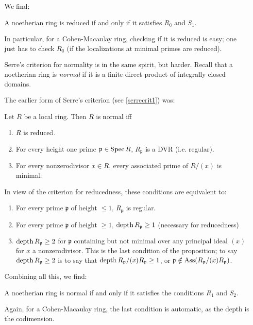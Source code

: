 We find:
\begin{proposition} 
A noetherian ring is reduced if and only if it satisfies $R_0$ and $S_1$.
\end{proposition} 

In particular, for a Cohen-Macaulay ring, checking if it is reduced is
easy; one just has to check $R_0$ (if the localizations at minimal primes are
reduced).


Serre's criterion for normality is in the same spirit, but harder.
Recall that
a noetherian ring is \textit{normal} if it is a finite direct
product of
integrally closed domains.

The earlier form of Serre's criterion (see \cref{serrecrit1}) was:
\begin{proposition}
Let $R$ be a local ring.
Then $R$ is normal iff
\begin{enumerate}
\item  $R$ is reduced.
\item For every height one prime $\mathfrak{p}  \in \operatorname{Spec} R$,
$R_{\mathfrak{p}}$ is a DVR (i.e. regular).
\item For every nonzerodivisor $x \in R$, every associated prime
of $R/(x)$ is
minimal.
\end{enumerate}
\end{proposition}
In view of the criterion for reducedness, these conditions are equivalent to:
\begin{enumerate}
\item For every prime $\mathfrak{p}$ of height $\leq 1$,
$R_{\mathfrak{p}} $ is regular.
\item For every prime $\mathfrak{p}$ of height $\geq 1$,
$\operatorname{depth} R_{\mathfrak{p}} \geq 1$ (necessary for reducedness)
\item $\operatorname{depth} R_{\mathfrak{p}} \geq 2$ for $\mathfrak{p}$ containing but not
minimal over any
principal ideal $(x)$ for $x$ a nonzerodivisor. This 
is the last
condition of the proposition; to say $\operatorname{depth} R_{\mathfrak{p}} \geq 2$ is to
say that $\operatorname{depth} R_{\mathfrak{p}}/(x)R_{\mathfrak{p}} \geq 1$, or
$\mathfrak{p} \notin
\operatorname{Ass}(R_{\mathfrak{p}}/(x)R_{\mathfrak{p}})$.
\end{enumerate}

Combining all this, we find:
\begin{theorem} A noetherian ring is normal
if and only if it satisfies the conditions $R_1$ and $S_2$.
\end{theorem}

Again, for a Cohen-Macaulay ring, the last condition is automatic, as
the depth is the
codimension.

